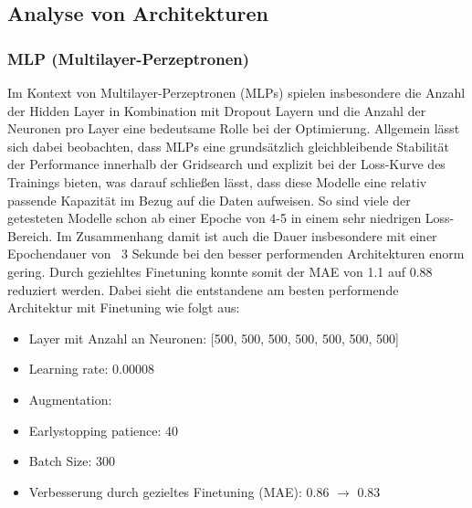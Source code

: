 \documentclass[manuscript,screen,review]{acmart}
\begin{document}

\subsection{Analyse von Architekturen}

\subsubsection*{MLP (Multilayer-Perzeptronen)}
Im Kontext von Multilayer-Perzeptronen (MLPs) spielen insbesondere die Anzahl der Hidden Layer in Kombination mit Dropout Layern und die Anzahl der Neuronen pro Layer eine bedeutsame Rolle bei der Optimierung.
Allgemein lässt sich dabei beobachten, dass MLPs eine grundsätzlich gleichbleibende Stabilität der Performance innerhalb der Gridsearch und explizit bei der Loss-Kurve des Trainings bieten, was darauf schließen lässt, dass diese Modelle eine relativ passende Kapazität im Bezug auf die Daten aufweisen. So sind viele der getesteten Modelle schon ab einer Epoche von 4-5 in einem sehr niedrigen Loss-Bereich.  Im Zusammenhang damit ist auch die Dauer insbesondere mit einer Epochendauer von ~3 Sekunde bei den besser performenden Architekturen enorm gering.
Durch geziehltes Finetuning konnte somit der MAE von 1.1 auf 0.88 reduziert werden.
Dabei sieht die entstandene am besten performende Architektur mit Finetuning wie folgt aus:
\begin{itemize}
    \item Layer mit Anzahl an Neuronen: [500, 500, 500, 500, 500, 500, 500]
    \item Learning rate: 0.00008
    \item Augmentation: 
    \item Earlystopping patience: 40
    \item Batch Size: 300
    \item Verbesserung durch gezieltes Finetuning (MAE): 0.86 $\rightarrow$ 0.83
\end{itemize}

\end{document}
